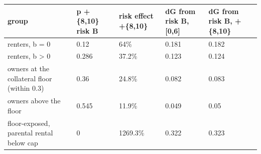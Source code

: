 \begingroup\small
\setlength{\tabcolsep}{3pt}
\renewcommand{\arraystretch}{1.04}
\begin{tabularx}{\linewidth}{XXXXX}
\toprule
group & p +\{8,10\} risk B & risk effect +\{8,10\} & dG from risk B, [0,6] & dG from risk B, +\{8,10\} \\
\midrule
renters, b = 0 & 0.12 & 64\% & 0.181 & 0.182 \\
renters, b \textgreater{} 0 & 0.286 & 37.2\% & 0.123 & 0.124 \\
owners at the collateral floor (within 0.3) & 0.36 & 24.8\% & 0.082 & 0.083 \\
owners above the floor & 0.545 & 11.9\% & 0.049 & 0.05 \\
floor-exposed, parental rental below cap & 0 & 1269.3\% & 0.322 & 0.323 \\
\bottomrule
\end{tabularx}
\endgroup

